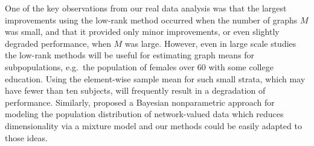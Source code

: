 \documentclass[journal,twoside,web]{ieeecolor}
\begin{document}
One of the key observations from our real data analysis was that the largest improvements using the low-rank method occurred when the number of graphs $M$ was small, and that it provided only minor improvements, or even slightly degraded performance, when $M$ was large.
However, even in large scale studies the low-rank methods will be useful for estimating graph means for subpopulations, e.g.\ the population of females over 60 with some college education.
Using the element-wise sample mean for such small strata, which may have fewer than ten subjects, will frequently result in a degradation of performance.
Similarly, \cite{durante2016nonparametric} proposed a Bayesian nonparametric approach for modeling the population distribution of network-valued data which reduces dimensionality via a mixture model and our methods could be easily adapted to those ideas.






\end{document}
